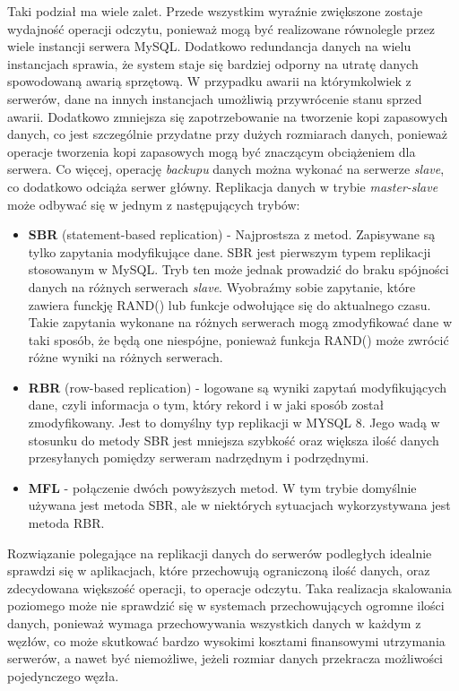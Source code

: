 Taki podział ma wiele zalet. Przede wszystkim wyraźnie zwiększone zostaje wydajność operacji odczytu, ponieważ mogą być realizowane równolegle przez wiele instancji serwera MySQL. Dodatkowo redundancja danych na wielu instancjach sprawia, że system staje się bardziej odporny na utratę danych spowodowaną awarią sprzętową. W przypadku awarii na którymkolwiek z serwerów, dane na innych instancjach umożliwią przywrócenie stanu sprzed awarii. Dodatkowo zmniejsza się zapotrzebowanie na tworzenie kopi zapasowych danych, co jest szczególnie przydatne przy dużych rozmiarach danych, ponieważ operacje tworzenia kopi zapasowych mogą być znaczącym obciążeniem dla serwera. Co więcej, operację \textit{backupu} danych można wykonać na serwerze \textit{slave}, co dodatkowo odciąża serwer główny. Replikacja danych w trybie \textit{master-slave} może odbywać się w jednym z następujących trybów:
\begin{itemize}
 	\item \textbf{SBR} (statement-based replication) - Najprostsza z metod. Zapisywane są tylko zapytania modyfikujące dane. SBR jest pierwszym typem replikacji stosowanym w MySQL. Tryb ten może jednak prowadzić do braku spójności danych na różnych serwerach \textit{slave}. Wyobraźmy sobie zapytanie, które zawiera funckję RAND() lub funkcje odwołujące się do aktualnego czasu. Takie zapytania wykonane na różnych serwerach mogą zmodyfikować dane w taki sposób, że będą one niespójne, ponieważ funkcja RAND() może zwrócić różne wyniki na różnych serwerach.
	\item \textbf{RBR} (row-based replication) - logowane są wyniki zapytań modyfikujących dane, czyli informacja o tym, który rekord i w jaki sposób został zmodyfikowany. Jest to domyślny typ replikacji w MYSQL 8. Jego wadą w stosunku do metody SBR jest mniejsza szybkość oraz większa ilość danych przesyłanych pomiędzy serweram nadrzędnym i podrzędnymi.
	\item \textbf{MFL} - połączenie dwóch powyższych metod. W tym trybie domyślnie używana jest metoda SBR, ale w niektórych sytuacjach wykorzystywana jest metoda RBR.
\end{itemize}

Rozwiązanie polegające na replikacji danych do serwerów podległych idealnie sprawdzi się w aplikacjach, które przechowują ograniczoną ilość danych, oraz zdecydowana większość operacji, to operacje odczytu. Taka realizacja skalowania poziomego może nie sprawdzić się w systemach przechowujących ogromne ilości danych, ponieważ wymaga przechowywania wszystkich danych w każdym z węzłów, co może skutkować bardzo wysokimi kosztami finansowymi utrzymania serwerów, a nawet być niemożliwe, jeżeli rozmiar danych przekracza możliwości pojedynczego węzła. 


